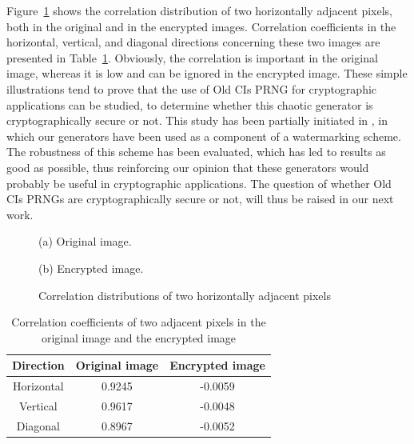 Figure~\ref{Correlation distributions of two horizontally adjacent pixels in the original image and the encrypted image}
shows the correlation distribution of two horizontally adjacent pixels, both in the original and in
the encrypted images. 
Correlation coefficients in the horizontal, vertical, and diagonal directions concerning these two images are presented in Table~\ref{Correlation coefficients of two adjacent pixels in the original image and the encrypted image}. 
Obviously, the correlation is important in the original image, whereas it is low and can be ignored in the encrypted image.
These simple illustrations tend to prove that the use of Old CIs PRNG for cryptographic applications can be studied, to determine whether this chaotic generator is cryptographically secure or not.
This study has been partially initiated in \cite{guyeuxTaiwan10,bgw10:ip}, in which our generators have been used as a component of a watermarking scheme.
The robustness of this scheme has been evaluated, which has led to results as good as possible, thus reinforcing our opinion that these generators would probably be useful in cryptographic applications.
The question of whether Old CIs PRNGs are cryptographically secure or not, will thus be raised in our next work.

\begin{figure}
\begin{minipage}[b]{.48\linewidth}
\centering
\centerline{}
\centerline{(a) Original image.}
\end{minipage}
\hfill
\begin{minipage}[b]{0.48\linewidth}
\centering
\centerline{}
\centerline{(b) Encrypted image.}
\end{minipage}
\caption{Correlation distributions of two horizontally adjacent pixels}
\label{Correlation distributions of two horizontally adjacent pixels in the original image and the encrypted image}
\end{figure}

\begin{table}
\renewcommand{\arraystretch}{1.3}
\caption{Correlation coefficients of two adjacent pixels in the original image and the encrypted image}
\label{Correlation coefficients of two adjacent pixels in the original image and the encrypted image}
\centering
\begin{tabular}{ccc} \toprule
\textbf{Direction} &\textbf{Original image} & \textbf{Encrypted image} \\ \midrule
Horizontal &0.9245 &-0.0059 \\
Vertical &0.9617 &-0.0048 \\
Diagonal &0.8967 &-0.0052 \\ \bottomrule
\end{tabular}
\end{table}


